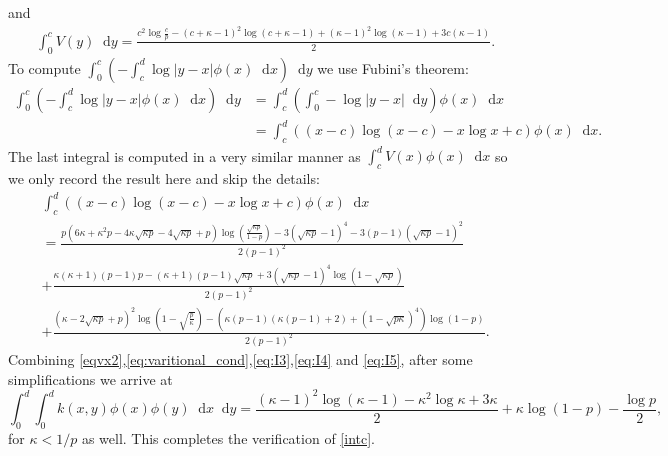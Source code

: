 \documentclass[reqno,11pt]{amsart}
\numberwithin{equation}{section}
\theoremstyle{definition}
\newcommand*\diff{\mathop{}\!\mathrm{d}}
\begin{document}
and
\begin{equation}\label{eq:I4}
\begin{aligned}
    &\int_0^c V(y)\diff y = \frac{c^2\log \frac{c}{p}-(c+\kappa-1)^2\log(c+\kappa-1)+(\kappa-1)^2\log(\kappa-1)+3c(\kappa-1)}{2}.
\end{aligned}
\end{equation}
To compute $\displaystyle\int_0^c\left(-\int_c^d \log|y-x|\phi(x)\diff x\right)\diff y$ we use Fubini's theorem:
\begin{equation*}
    \begin{aligned}
        \int_0^c\left(-\int_c^d \log|y-x|\phi(x)\diff x\right)\diff y &= \int_c^d \left(\int_0^c -\log|y-x|\diff y\right)\phi(x)\diff x\\
        &= \int_c^d \left((x-c)\log(x-c)-x\log x+c\right)\phi(x)\diff x.
    \end{aligned}
\end{equation*}
The last integral is computed in a very similar manner as $\displaystyle \int_c^d V(x)\phi(x)\diff x$ so we only record the result here and skip the details:
\begin{equation}\label{eq:I5}
\begin{aligned}
    &\int_c^d \left((x-c)\log(x-c)-x\log x+c\right)\phi(x)\diff x\\
    &= \frac{p \left(6 \kappa +\kappa ^2 p-4 \kappa  \sqrt{\kappa  p}-4 \sqrt{\kappa  p}+p\right) \log \left(\frac{\sqrt{\kappa  p}}{1-p}\right)-3 \left(\sqrt{\kappa  p}-1\right)^4-3 (p-1) \left(\sqrt{\kappa  p}-1\right)^2}{2 (p-1)^2}\\
    &+\frac{\kappa  (\kappa +1) (p-1) p-(\kappa +1) (p-1) \sqrt{\kappa  p}+3\left(\sqrt{\kappa  p}-1\right)^4 \log \left(1-\sqrt{\kappa  p}\right)}{2 (p-1)^2}\\
    &+\frac{\left(\kappa -2 \sqrt{\kappa  p}+p\right)^2 \log \left(1-\sqrt{\frac{p}{\kappa }}\right)-\left(\kappa  (p-1) (\kappa  (p-1)+2)+(1 - \sqrt{p \kappa})^4\right) \log (1-p)}{2(p-1)^2}.
\end{aligned}
\end{equation}
Combining \eqref{eqvx2},\eqref{eq:varitional_cond},\eqref{eq:I3},\eqref{eq:I4} and \eqref{eq:I5}, after some simplifications we arrive at 
\begin{equation*}
    \int_0^d\int_0^d k(x,y)\phi(x)\phi(y)\diff x\diff y = \frac{(\kappa-1)^2\log (\kappa-1)-\kappa^2 \log \kappa+3\kappa}{2}+\kappa \log(1-p)-\frac{\log p}{2},
\end{equation*}
for $\kappa<1/p$ as well. This completes the verification of \eqref{intc}.
\end{document}
